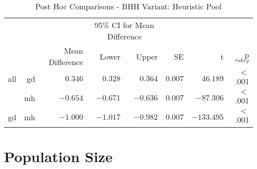 \begin{table}[htbp]
	\centering
	\caption{Post Hoc Comparisons - BHH Variant: Heuristic Pool}
	\label{tab:results:heuristic_pool:post_hoc}%
	\par\bigskip
	\resizebox{\textwidth}{!}
	{
		\begin{tabular}{lrrrrrrr}
			\toprule
			\multicolumn{1}{c}{} & \multicolumn{1}{c}{} & \multicolumn{1}{c}{} & \multicolumn{2}{c}{95\% CI for Mean Difference} & \multicolumn{1}{c}{} & \multicolumn{1}{c}{} & \multicolumn{1}{c}{}               \\
			\cline{4-5}
			$ $                  & $ $                  & Mean Difference      & Lower                                           & Upper                & SE                   & t                    & p$_{tukey}$ \\
			\cmidrule[0.4pt]{1-8}
			all                  & gd                   & $0.346$              & $0.328$                                         & $0.364$              & $0.007$              & $46.189$             & $<$ .001    \\
			$ $                  & mh                   & $-0.654$             & $-0.671$                                        & $-0.636$             & $0.007$              & $-87.306$            & $<$ .001    \\
			gd                   & mh                   & $-1.000$             & $-1.017$                                        & $-0.982$             & $0.007$              & $-133.495$           & $<$ .001    \\
			\bottomrule
		\end{tabular}
	}
\end{table}

\section{Population Size}\label{app:statistical_analysis:bhh_variant_population}

